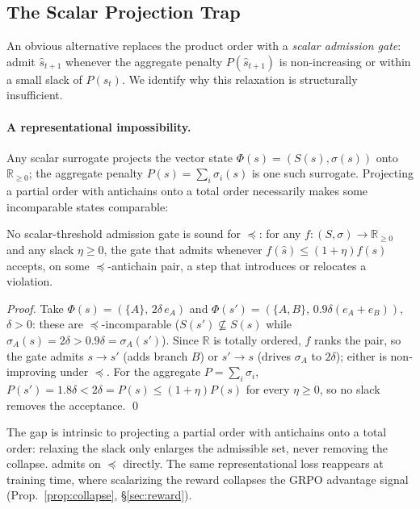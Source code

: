\subsection{The Scalar Projection Trap}
\label{sec:method:trap}

An obvious alternative replaces the product order with a \emph{scalar admission gate}: admit $\hat{s}_{t+1}$ whenever the aggregate penalty $P(\hat{s}_{t+1})$ is non-increasing or within a small slack of $P(s_t)$. We identify why this relaxation is structurally insufficient.

\paragraph{A representational impossibility.}
Any scalar surrogate projects the vector state $\Phi(s)=(S(s),\sigma(s))$ onto $\mathbb{R}_{\ge 0}$; the aggregate penalty $P(s)=\sum_i\sigma_i(s)$ is one such surrogate. Projecting a partial order with antichains onto a total order necessarily makes some incomparable states comparable:
\begin{proposition}
\label{prop:gap}
No scalar-threshold admission gate is sound for $\preceq$: for any $f:(S,\sigma)\to\mathbb{R}_{\ge 0}$ and any slack $\eta\ge0$, the gate that admits whenever $f(\hat{s})\le(1{+}\eta)f(s)$ accepts, on some $\preceq$-antichain pair, a step that introduces or relocates a violation.
\end{proposition}
\begin{proof}
Take $\Phi(s)=(\{A\},\,2\delta\,e_A)$ and $\Phi(s')=(\{A,B\},\,0.9\delta(e_A{+}e_B))$, $\delta>0$: these are $\preceq$-incomparable ($S(s')\not\subseteq S(s)$ while $\sigma_A(s)=2\delta>0.9\delta=\sigma_A(s')$). Since $\mathbb{R}$ is totally ordered, $f$ ranks the pair, so the gate admits $s\!\to\!s'$ (adds branch $B$) or $s'\!\to\!s$ (drives $\sigma_A$ to $2\delta$); either is non-improving under $\preceq$. For the aggregate $P=\sum_i\sigma_i$, $P(s')=1.8\delta<2\delta=P(s)\le(1{+}\eta)P(s)$ for every $\eta\ge0$, so no slack removes the acceptance. \qed
\end{proof}
The gap is intrinsic to projecting a partial order with antichains onto a total order: relaxing the slack only enlarges the admissible set, never removing the collapse. \silr{} admits on $\preceq$ directly. The same representational loss reappears at training time, where scalarizing the reward collapses the GRPO advantage signal (Prop.~\ref{prop:collapse}, \S\ref{sec:reward}).

